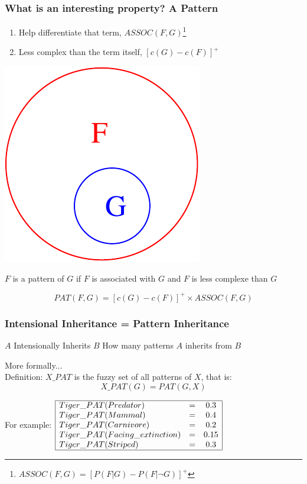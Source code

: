 \documentclass{beamer}
\begin{document}
\frame
{
  \frametitle{What is an \alert{interesting} property? A \alert{Pattern}}

  \begin{enumerate}
  \item Help \alert{differentiate} that term, $ASSOC(F,G)$\footnote{
      $ASSOC(F,G) = [P(F|G)-P(F|\lnot G)]^+$}

  \item \alert{Less complex} than the term itself,
    $[c(G)-c(F)]^+$
  \end{enumerate}
    \includegraphics[scale=0.2]{F_G.pdf}  
  \pause

  \begin{beamerboxesrounded}{$F$ is a \alert{pattern} of $G$ if}
    $F$ is \alert{associated} with $G$ and $F$ is \alert{less complexe} than $G$
  \end{beamerboxesrounded}


    \[PAT(F,G)=[c(G)-c(F)]^+ \times ASSOC(F,G)\]
    
}

\frame
{
  \frametitle{Intensional Inheritance = Pattern Inheritance}

  \begin{beamerboxesrounded}{$A$ Intensionally Inherits $B$}
    \alert{How many patterns} $A$ inherits from $B$
  \end{beamerboxesrounded}
  
  \pause
  
  More formally...\\[2ex]

  Definition: $X\_PAT$ is the \alert{fuzzy set of all patterns of $X$}, that is:
  \[X\_PAT(G) = PAT(G,X)\]
 
  \pause
  
  For example:
  $
  \begin{array}{|lcc|}
    \hline
    Tiger\_PAT(Predator) & = & 0.3\\
    Tiger\_PAT(Mammal) & = & 0.4\\
    Tiger\_PAT(Carnivore) & = & 0.2\\
    Tiger\_PAT(Facing\_extinction) & = & 0.15\\
    Tiger\_PAT(Striped) & = & 0.3\\
    \hline
  \end{array}
  $
}
\end{document}

